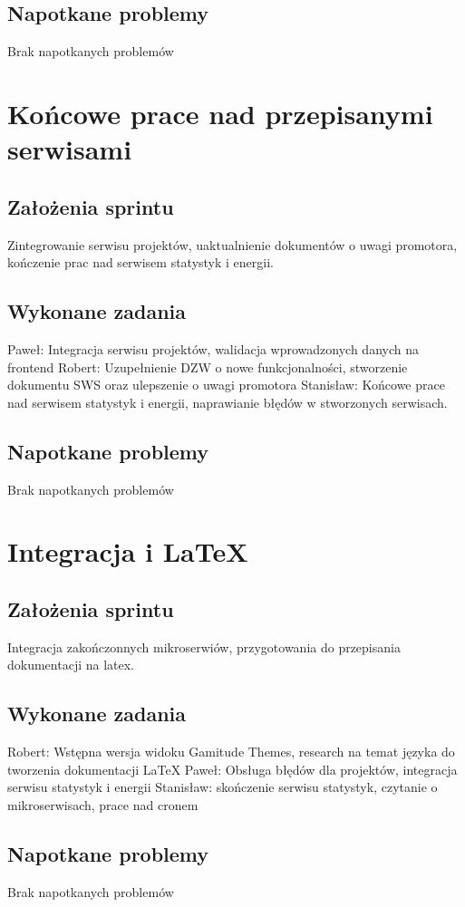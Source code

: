 \documentclass[a4paper,11pt]{report}
\begin{document}
\subsection {Napotkane problemy}
Brak napotkanych problemów

\section {Końcowe prace nad przepisanymi serwisami}
\subsection {Założenia sprintu}
Zintegrowanie serwisu projektów, uaktualnienie dokumentów o uwagi promotora, kończenie prac nad serwisem statystyk i energii.
\subsection {Wykonane zadania}
Paweł: Integracja serwisu projektów, walidacja wprowadzonych danych na frontend
Robert: Uzupełnienie DZW o nowe funkcjonalności, stworzenie dokumentu SWS oraz ulepszenie o uwagi promotora
Stanisław: Końcowe prace nad serwisem statystyk i energii, naprawianie błędów w stworzonych serwisach.
\subsection {Napotkane problemy}
Brak napotkanych problemów

\section {Integracja i LaTeX}
\subsection {Założenia sprintu}
Integracja zakończonnych mikroserwiów, przygotowania do przepisania dokumentacji na latex.
\subsection {Wykonane zadania}
Robert: Wstępna wersja widoku Gamitude Themes, research na temat języka do tworzenia dokumentacji LaTeX
Paweł: Obsługa błędów dla projektów, integracja serwisu statystyk i energii
Stanisław: skończenie serwisu statystyk, czytanie o mikroserwisach, prace nad cronem
\subsection {Napotkane problemy}
Brak napotkanych problemów
\end{document}
